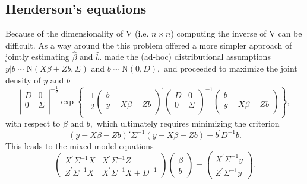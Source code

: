 \documentclass[12pt, a4paper]{report}
\theoremstyle{plain}
\theoremstyle{definition}
\theoremstyle{remark}
\begin{document}
		\subsection{Henderson's equations}
		Because of the dimensionality of V (i.e. $n \times n$) computing the inverse of V can be difficult. As a way around the this problem \citet{Henderson53, Henderson59,Henderson63,Henderson73,Henderson84a} offered a more simpler approach of jointly estimating $\hat{\beta}$ and $\hat{b}$.
		\cite{Henderson:1950} made the (ad-hoc) distributional assumptions $y|b \sim \mathrm{N} (X \beta + Zb, \Sigma)$ and $b \sim \mathrm{N}(0,D),$ and proceeded to maximize the joint density of $y$ and $b$
		\begin{equation}
			\left|
			\begin{array}{cc}
				D & 0 \\
				0 & \Sigma \\
			\end{array}
			\right|^{-\frac{1}{2}}
			\exp
			\left\{ -\frac{1}{2}
			\left(
			\begin{array}{c}
				b \\
				y - X \beta -Zb \\
			\end{array}
			\right)^\prime
			\left( \begin{array}{cc}
				D & 0 \\
				0 & \Sigma \\
			\end{array}\right)^{-1}
			\left(
			\begin{array}{c}
				b \\
				y - X \beta -Zb \\
			\end{array}
			\right)
			\right\},
			\label{u&beta:JointDensity}
		\end{equation}
		with respect to $\beta$ and $b,$ which ultimately requires minimizing the criterion
		\begin{equation}
			(y - X \beta -Zb)'\Sigma^{-1}(y - X \beta -Zb) + b^\prime D^{-1}b.
			\label{Henderson:Criterion}
		\end{equation}
		This leads to the mixed model equations
		\begin{equation}
			\left(\begin{array}{cc}
				X^\prime\Sigma^{-1}X & X^\prime\Sigma^{-1}Z
				\\
				Z^\prime\Sigma^{-1}X & X^\prime\Sigma^{-1}X + D^{-1}
			\end{array}\right)
			\left(\begin{array}{c}
				\beta \\
				b
			\end{array}\right)
			=
			\left(\begin{array}{c}
				X^\prime\Sigma^{-1}y \\
				Z^\prime\Sigma^{-1}y
			\end{array}\right).
			\label{Henderson:Equations}
		\end{equation}
\end{document}
